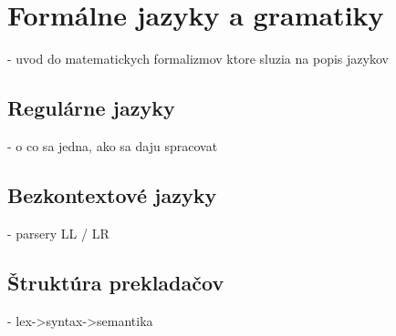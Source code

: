 \chapter{Formálne jazyky a gramatiky}
	- uvod do matematickych formalizmov ktore sluzia na popis jazykov
\section{Regulárne jazyky}
		- o co sa jedna, ako sa daju spracovat
\section{Bezkontextové jazyky}
		- parsery LL / LR
\section{Štruktúra prekladačov}
		- lex->syntax->semantika


